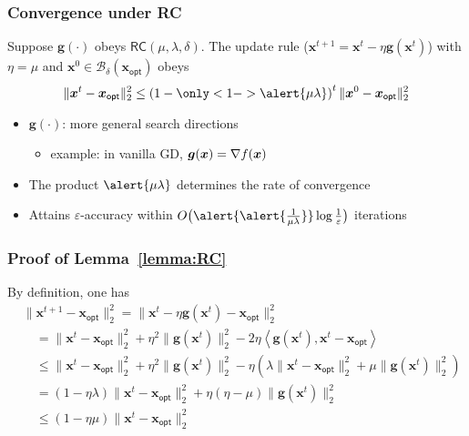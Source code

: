 \documentclass[compress,
mathserif,wide,%
]{beamer}
\begin{document}
\begin{frame}

\frametitle{Convergence  under RC}

 \begin{lemma}\label{lemma:RC}
 Suppose $\bm{g}(\cdot)$ obeys $\mathsf{RC}( \mu,\lambda, \delta )$. The update rule ($\bm{x}^{t+1} = \bm{x}^t - \eta \bm{g}(\bm{x}^t)$) with $\eta = \mu$  and $\bm{x}^{0} \in \mathcal{B}_{\delta}(\bm{x}_{\mathsf{opt}})$ obeys
	\[
		\|\bm{x}^{t} -\bm{x}_{\mathsf{opt}} \|_2^{2} \leq \left(1- \only<1->{\alert{\mu\lambda}} \right)^{t} \|\bm{x}^{0} -\bm{x}_{\mathsf{opt}} \|_2^{2}
	\]
 \end{lemma}



\begin{itemize}
	\itemsep0.5em
	\item $\bm{g}(\cdot)$: more general search directions
	\begin{itemize}
		\item example: in vanilla GD, $\bm{g}({\bm x})=\nabla f({\bm x})$
	\end{itemize}
	\item The product $\alert{\mu\lambda}$ determines the rate of convergence
	\item Attains $\varepsilon$-accuracy within $O\big( \alert{ \alert{\frac{1}{\mu\lambda}}} \log\frac{1}{\varepsilon} \big)$ iterations
\end{itemize}


\end{frame}


\begin{frame}
	\frametitle{Proof of Lemma~\ref{lemma:RC}}
	By definition, one has
	\begin{align*}
&\|\bm{x}^{t+1}-\bm{x}_{\mathsf{opt}}\|_{2}^{2} =\|\bm{x}^{t}-\eta\bm{g}(\bm{x}^{t})-\bm{x}_{\mathsf{opt}}\|_{2}^{2}\\
 &\quad =\|\bm{x}^{t}-\bm{x}_{\mathsf{opt}}\|_{2}^{2}+\eta^{2}\|\bm{g}(\bm{x}^{t})\|_{2}^{2}-2\eta\left\langle \bm{g}(\bm{x}^{t}),\bm{x}^{t}-\bm{x}_{\mathsf{opt}}\right\rangle \\
 &\quad \leq\|\bm{x}^{t}-\bm{x}_{\mathsf{opt}}\|_{2}^{2}+\eta^{2}\|\bm{g}(\bm{x}^{t})\|_{2}^{2}-\eta\left(\lambda\|\bm{x}^{t}-\bm{x}_{\mathsf{opt}}\|_{2}^{2}+\mu\|\bm{g}(\bm{x}^{t})\|_{2}^{2}\right)\\
 &\quad =(1-\eta\lambda)\|\bm{x}^{t}-\bm{x}_{\mathsf{opt}}\|_{2}^{2}+\eta(\eta-\mu)\|\bm{g}(\bm{x}^{t})\|_{2}^{2}\\
 &\quad \leq(1-\eta\mu)\|\bm{x}^{t}-\bm{x}_{\mathsf{opt}}\|_{2}^{2}
\end{align*}
\end{frame}
\end{document}
